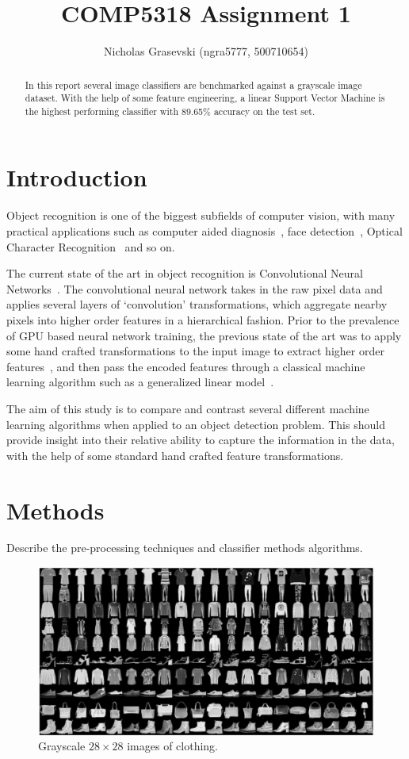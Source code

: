 \documentclass[landscape,twocolumn]{article}
\title{COMP5318 Assignment 1}
\author{Nicholas Grasevski (ngra5777, 500710654)}
\begin{document}
\maketitle
\begin{abstract}
	In this report several image classifiers are benchmarked against a grayscale image dataset. With the help of some feature engineering, a linear Support Vector Machine is the highest performing classifier with 89.65\% accuracy on the test set.
\end{abstract}

\section{Introduction}
Object recognition is one of the biggest subfields of computer vision, with many practical applications such as computer aided diagnosis~\cite{doi2007computer}, face detection~\cite{hjelmaas2001face}, Optical Character Recognition~\cite{mori1999optical} and so on.

The current state of the art in object recognition is Convolutional Neural Networks~\cite{iandola2016squeezenet}. The convolutional neural network takes in the raw pixel data and applies several layers of `convolution' transformations, which aggregate nearby pixels into higher order features in a hierarchical fashion. Prior to the prevalence of GPU based neural network training, the previous state of the art was to apply some hand crafted transformations to the input image to extract higher order features~\cite{rybski2010visual}, and then pass the encoded features through a classical machine learning algorithm such as a generalized linear model~\cite{ebrahimzadeh2014efficient}.

The aim of this study is to compare and contrast several different machine learning algorithms when applied to an object detection problem. This should provide insight into their relative ability to capture the information in the data, with the help of some standard hand crafted feature transformations.

\section{Methods}
Describe the pre-processing techniques and classifier methods algorithms.

\begin{figure}[ht]
	\includegraphics[width=\linewidth]{../Dataset_image}
	\caption{Grayscale $28 \times 28$ images of clothing.}\label{fig:images}
\end{figure}
\end{document}
